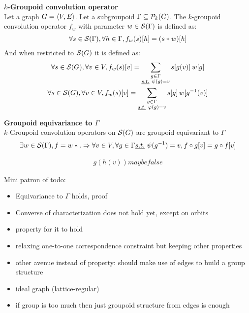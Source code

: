 \begin{definition}\textbf{$k$-Groupoid convolution operator}\\
Let a graph $\gve$. Let a subgroupoid $\Gamma \subseteq \cp_k(G)$. The $k$-groupoid convolution operator $f_w$ with parameter $w \in \cs(\Gamma)$ is defined as:
\begin{gather*}
\forall s \in \cs(\Gamma), \forall h \in \Gamma, f_w(s)[h] = (s \ast w)[h]
\end{gather*}
And when restricted to $\cs(G)$ it is defined as:
\begin{gather*}
\forall s \in \cs(G), \forall v \in V, f_w(s)[v] = \displaystyle \sum_{\substack{g \in \Gamma\\ \st \psi(g) = v}} s[g(v)] \h{2} w[g]\\
\forall s \in \cs(G), \forall v \in V, f_w(s)[v] = \displaystyle \sum_{\substack{g \in \Gamma\\ \st \varphi(g) = v}} s[g] \h{2} w[g^{-1}(v)]
\end{gather*}
\end{definition}

\begin{proposition}\textbf{Groupoid equivariance to $\Gamma$}\\
$k$-Groupoid convolution operators on $\cs(G)$ are groupoid equivariant to $\Gamma$ \ie
\begin{gather*}
\exists w \in \cs(\Gamma), f = w \ast . \Rightarrow
\forall v \in V, \forall g \in \Gamma \st \psi(g^{-1}) = v,
f \circ g [v]= g \circ f [v]
\end{gather*}
\label{prop:equi}
\end{proposition}

\begin{gather}
g(h(v)) maybe false
\end{gather}




Mini patron of todo:
\begin{itemize}
\item Equivariance to $\Gamma$ holds, proof
\item Converse of characterization does not hold yet, except on orbits
\item property for it to hold
\item relaxing one-to-one correspondence constraint but keeping other properties
\item other avenue instead of property: should make use of edges to build a group structure
\item ideal graph (lattice-regular)
\item if group is too much then just groupoid structure from edges is enough
\end{itemize}

